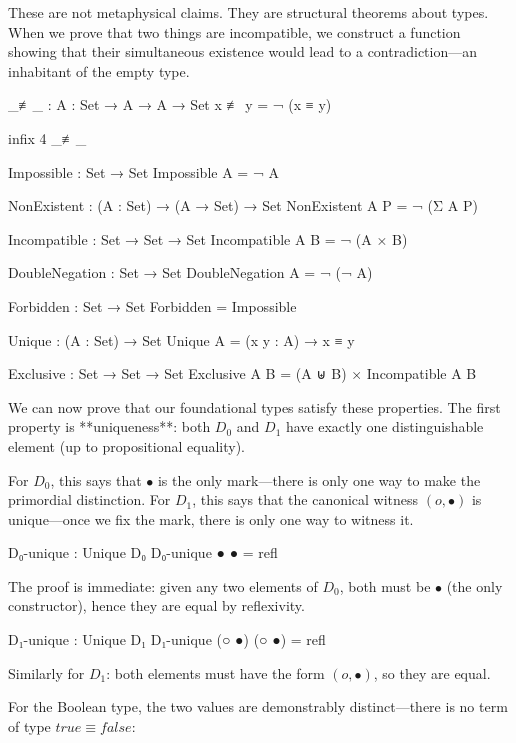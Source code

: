 \documentclass[11pt,a4paper]{book}
\def\circ{o}%
\def\texttt#1{#1}%
\begin{document}
These are not metaphysical claims. They are structural theorems about types. When we 
prove that two things are incompatible, we construct a function showing that their 
simultaneous existence would lead to a contradiction—an inhabitant of the empty type.

\begin{code}
_≢_ : {A : Set} → A → A → Set
x ≢ y = ¬ (x ≡ y)

infix 4 _≢_

Impossible : Set → Set
Impossible A = ¬ A

NonExistent : (A : Set) → (A → Set) → Set
NonExistent A P = ¬ (Σ A P)

Incompatible : Set → Set → Set
Incompatible A B = ¬ (A × B)

DoubleNegation : Set → Set
DoubleNegation A = ¬ (¬ A)
\end{code}

\begin{code}
Forbidden : Set → Set
Forbidden = Impossible

Unique : (A : Set) → Set
Unique A = (x y : A) → x ≡ y

Exclusive : Set → Set → Set
Exclusive A B = (A ⊎ B) × Incompatible A B
\end{code}

We can now prove that our foundational types satisfy these properties. 
The first property is **uniqueness**: both $D_0$ and $D_1$ have exactly one 
distinguishable element (up to propositional equality).

For $D_0$, this says that $\bullet$ is the only mark—there is only one way to make 
the primordial distinction. For $D_1$, this says that the canonical witness 
$(\circ, \bullet)$ is unique—once we fix the mark, there is only one way to witness it.

\begin{code}
D₀-unique : Unique D₀
D₀-unique ● ● = refl
\end{code}

The proof is immediate: given any two elements of $D_0$, both must be $\bullet$ 
(the only constructor), hence they are equal by reflexivity.

\begin{code}
D₁-unique : Unique D₁
D₁-unique (○ ●) (○ ●) = refl
\end{code}

Similarly for $D_1$: both elements must have the form $(\circ, \bullet)$, so they 
are equal.

For the Boolean type, the two values are demonstrably distinct—there is no term 
of type $\texttt{true} \equiv \texttt{false}$:
\end{document}
